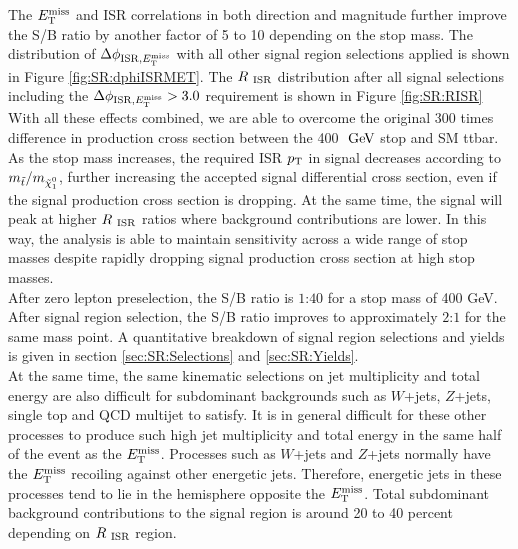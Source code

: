 \indent The $E_{\mathrm{T}}^{\mathrm{miss}}$ and ISR correlations in both direction and magnitude further improve the S/B ratio by another factor of 5 to 10 depending on the stop mass.  The distribution of $\Delta\phi_{\mathrm{ISR},E_{\mathrm{T}}^{\mathrm{miss}}}$ with all other signal region selections applied is shown in Figure \ref{fig:SR:dphiISRMET}. The $R_{~\mathrm{ISR}}$ distribution after all signal selections including the $\Delta\phi_{\mathrm{ISR},E_{\mathrm{T}}^{\mathrm{miss}}} > 3.0 $ requirement is shown in Figure \ref{fig:SR:RISR} \\

\indent With all these effects combined, we are able to overcome the original 300 times difference in production cross section between the 400 $\gev$ stop and SM ttbar.  \\

\indent As the stop mass increases, the required ISR $p_{\mathrm{T}}$ in signal decreases according to $m_{\stop}/m_{\ninoone}$, further increasing the accepted signal differential cross section, even if the signal production cross section is dropping.  At the same time, the signal will peak at higher $R_{~\mathrm{ISR}}$ ratios where background contributions are lower.  In this way, the analysis is able to maintain sensitivity across a wide range of stop masses despite rapidly dropping signal production cross section at high stop masses.  \\

\indent After zero lepton preselection, the S/B ratio is $1$:$40$ for a stop mass of 400 GeV.  After signal region selection, the S/B ratio improves to approximately $2$:$1$ for the same mass point.  A quantitative breakdown of signal region selections and yields is given in section \ref{sec:SR:Selections} and \ref{sec:SR:Yields}.  \\

\indent At the same time, the same kinematic selections on jet multiplicity and total energy are also difficult for subdominant backgrounds such as $W$+jets, $Z$+jets, single top and QCD multijet to satisfy.  It is in general difficult for these other processes to produce such high jet multiplicity and total energy in the same half of the event as the $E_{\mathrm{T}}^{\mathrm{miss}}$.   Processes such as $W$+jets and $Z$+jets normally have the $E_{\mathrm{T}}^{\mathrm{miss}}$ recoiling against other energetic jets.  Therefore, energetic jets in these processes tend to lie in the hemisphere opposite the $E_{\mathrm{T}}^{\mathrm{miss}}$.  Total subdominant background contributions to the signal region is around 20 to 40 percent depending on $R_{~\mathrm{ISR}}$ region.  \\




